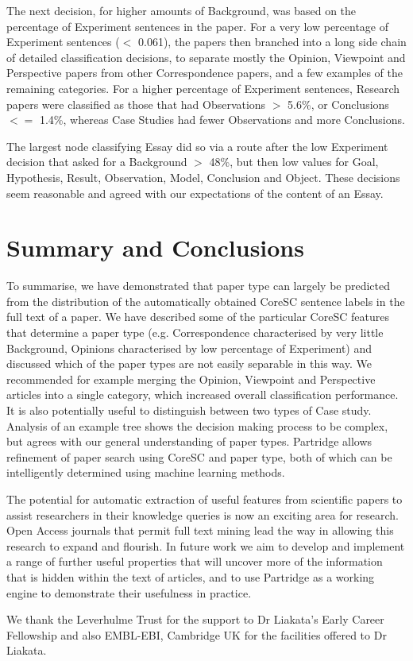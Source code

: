 \documentclass{svmult}
\begin{document}
The next decision, for higher amounts of Background, was based on the
percentage of Experiment sentences in the paper. For a very low
percentage of Experiment sentences ($<$ 0.061), the papers then
branched into a long side chain of detailed classification decisions,
to separate mostly the Opinion, Viewpoint and Perspective papers from
other Correspondence papers, and a few examples of the remaining
categories. For a higher percentage of Experiment sentences, Research
papers were classified as those that had Observations $>$ 5.6\%, or
Conclusions $<=$ 1.4\%, whereas Case Studies had fewer Observations
and more Conclusions.

The largest node classifying Essay did so via a route after the low
Experiment decision that asked for a Background $>$ 48\%, but then low
values for Goal, Hypothesis, Result, Observation, Model, Conclusion
and Object. These decisions seem reasonable and agreed with our
expectations of the content of an Essay.

\section{Summary and Conclusions}
\label{sec:4}
To summarise, we have demonstrated that paper type can largely be predicted
from the distribution of the automatically obtained CoreSC sentence labels in
the full text of a paper. We have described some of the particular CoreSC
features that determine a paper type (e.g. Correspondence characterised by very
little Background, Opinions characterised by low percentage of Experiment) and
discussed which of the paper types are not easily separable in this way. We
recommended for example merging the Opinion, Viewpoint and Perspective articles
into a single category, which increased overall classification performance. It
is also potentially useful to distinguish between two types of Case study.
Analysis of an example tree shows the decision making process to be complex,
but agrees with our general understanding of paper types. Partridge allows refinement of paper search using CoreSC and paper type, both of which
can be intelligently determined using machine learning methods.



The potential for automatic extraction of useful features from
scientific papers to assist researchers in their knowledge queries is
now an exciting area for research. Open Access journals that permit
full text mining lead the way in allowing this research to expand and
flourish. In future work we aim to develop and implement a range of
further useful properties that will uncover more of the information
that is hidden within the text of articles, and to use Partridge as a
working engine to demonstrate their usefulness in practice.

\begin{acknowledgement} We thank the Leverhulme Trust for the support to Dr
Liakata's Early Career Fellowship and also EMBL-EBI, Cambridge UK for the
facilities offered to Dr Liakata.  \end{acknowledgement}




%
\end{document}
